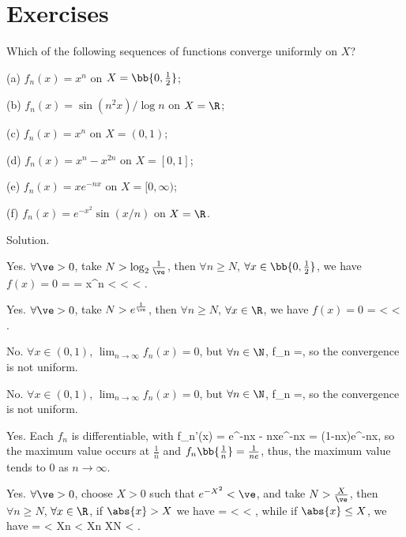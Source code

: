 
\section{Exercises}

\begin{exercise}
Which of the following sequences of functions converge uniformly on $X$?
\ben
\item [(a)] $f_n(x) = x^n$ on $X = \bb{0, \frac 12}$;
\item [(b)] $f_n(x) = \sin(n^2x)/ \log n$ on $X = \R$;
\item [(c)] $f_n(x) = x^n$ on $X = (0, 1)$;
\item [(d)] $f_n(x) = x^n - x^{2n}$ on $X = [0, 1]$;
\item [(e)] $f_n(x) = xe^{-nx}$ on $X = [0,\infty)$;
\item [(f)] $f_n(x) = e^{-x^2}\sin(x/n)$ on $X = \R$.
\een
\end{exercise}

Solution. \ben
\item [(a)] Yes. $\forall \ve >0$, take $N>\log_2\frac 1{\ve}$, then $\forall n\geq N$, $\forall x \in \bb{0,\tfrac 12}$, we have $f(x)=0$
\be
{} =  = x^n <  <  < \ve.
\ee

\item [(b)] Yes. $\forall \ve >0$, take $N>e^{\frac 1{\ve}}$, then $\forall n\geq N$, $\forall x \in \R$, we have $f(x)=0$
\be
{} =  \leq {} <  < \ve.
\ee

\item [(c)] No. $\forall x\in(0,1)$, $\lim_{n\to\infty}f_n(x) = 0$, but $\forall n\in \N$, 
\be
f_n =,
\ee
so the convergence is not uniform.

\item [(d)] No. $\forall x\in(0,1)$, $\lim_{n\to\infty}f_n(x) = 0$, but $\forall n\in \N$, 
\be
f_n =,
\ee
so the convergence is not uniform. 

\item [(e)] Yes. Each $f_n$ is differentiable, with 
\be
f_n'(x) = e^{-nx} - nxe^{-nx} = (1-nx)e^{-nx},
\ee
so the maximum value occurs at $\frac 1n$ and $f_n\bb{\tfrac 1n} = \tfrac 1{ne}$, thus, the maximum value tends to 0 as $n\to \infty$.

\item [(f)] Yes. $\forall \ve >0$, choose $X>0$ such that $e^{-X^2}<\ve$, and take $N> \tfrac X{\ve}$, then $\forall n\geq N$, $\forall x \in \R$, if $\abs{x} > X$ we have 
\be
{} =  \leq {} <  < \ve,
\ee
while if $\abs{x} \leq X$, we have
\be
{} =  \leq {} < \sin \frac Xn < \frac Xn \leq \frac XN < \ve.
\ee

